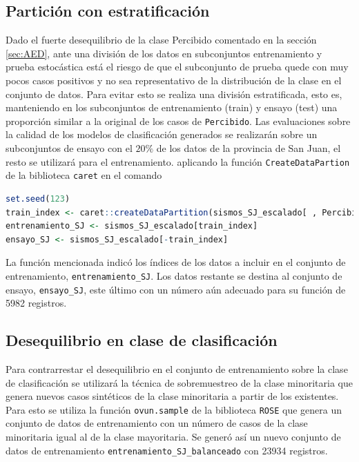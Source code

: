 \documentclass[a4paper]{report}
\begin{document}
\subsection{Partición con estratificación}\label{sec:partición}

Dado el fuerte desequilibrio de la clase Percibido comentado en la sección \ref{sec:AED}, ante una división de los datos en subconjuntos entrenamiento y prueba estocástica está el riesgo de que el subconjunto de prueba quede con muy pocos casos positivos y no sea representativo de la distribución de la clase en el conjunto de datos. 
Para evitar esto se realiza una división estratificada, esto es, 
manteniendo en los subconjuntos de entrenamiento (train) y ensayo (test) una proporción similar a la original de los casos de \verb'Percibido'.
Las evaluaciones sobre la calidad de los modelos de clasificación generados se realizarán sobre un subconjuntos de ensayo con el \(20 \%\) de los datos de la provincia de San Juan, el resto se utilizará para el entrenamiento.
aplicando la función \lstinline[language = R]'CreateDataPartion' de la biblioteca \lstinline[language = R]'caret' en el comando

\begin{lstlisting}[breaklines=true, language=R]
set.seed(123)
train_index <- caret::createDataPartition(sismos_SJ_escalado[ , Percibido], p = 0.8, list = FALSE)
entrenamiento_SJ <- sismos_SJ_escalado[train_index]
ensayo_SJ <- sismos_SJ_escalado[-train_index]
\end{lstlisting}

La función mencionada indicó los índices de los datos a incluir en el conjunto de entrenamiento, \lstinline[language = R]'entrenamiento_SJ'.
Los datos restante se destina al conjunto de ensayo, \lstinline[language = R]'ensayo_SJ', este último con un número aún adecuado para su función de \num{5982} registros.


\subsection{Desequilibrio en clase de clasificación}\label{sec:balanceo}
Para contrarrestar el desequilibrio en el conjunto de entrenamiento sobre la clase de clasificación se utilizará la técnica de sobremuestreo de la clase minoritaria que genera nuevos casos sintéticos de la clase minoritaria a partir de los existentes.
Para esto se utiliza la función \lstinline[language = R]'ovun.sample' de la biblioteca \lstinline[language = R]'ROSE' que genera un conjunto de datos de entrenamiento con un número de casos de la clase minoritaria igual al de la clase mayoritaria.
Se generó así un nuevo conjunto de datos de entrenamiento \lstinline[language = R]'entrenamiento_SJ_balanceado' con \num{23934} registros.
\end{document}
